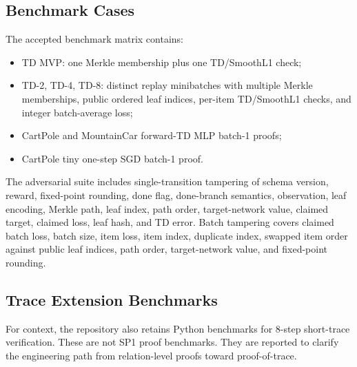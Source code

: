 \subsection{Benchmark Cases}

The accepted benchmark matrix contains:
\begin{itemize}[leftmargin=1.5em]
    \item TD MVP: one Merkle membership plus one TD/SmoothL1 check;
    \item TD-2, TD-4, TD-8: distinct replay minibatches with multiple Merkle
    memberships, public ordered leaf indices, per-item TD/SmoothL1 checks, and
    integer batch-average loss;
    \item CartPole and MountainCar forward-TD MLP batch-1 proofs;
    \item CartPole tiny one-step SGD batch-1 proof.
\end{itemize}

The adversarial suite includes single-transition tampering of schema version,
reward, fixed-point rounding, done flag, done-branch semantics, observation,
leaf encoding, Merkle path, leaf index, path order, target-network value,
claimed target, claimed loss, leaf hash, and TD error. Batch tampering covers
claimed batch loss, batch size, item loss, item index, duplicate index, swapped
item order against public leaf indices, path order, target-network value, and
fixed-point rounding.

\subsection{Trace Extension Benchmarks}

For context, the repository also retains Python benchmarks for 8-step
short-trace verification. These are not SP1 proof benchmarks. They are reported
to clarify the engineering path from relation-level proofs toward
proof-of-trace.
